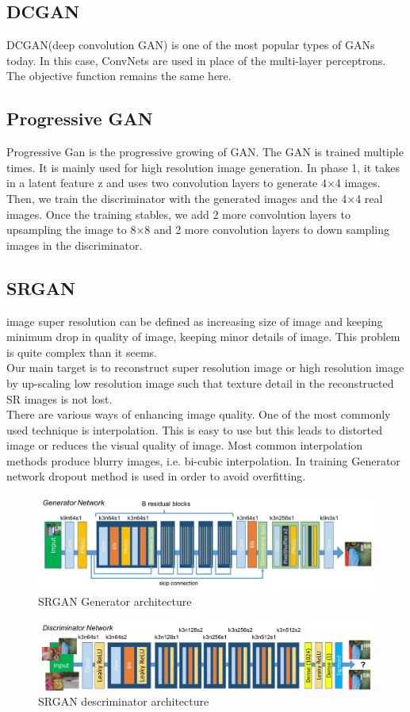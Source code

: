 \documentclass[12pt]{article}
\begin{document}
\subsection{DCGAN}
DCGAN(deep convolution GAN)\cite{ImageNet} is one of the most popular types of GANs\cite{GAN} today. In this case, ConvNets are used in place of the multi-layer perceptrons. The objective function remains the same here. 
\subsection{Progressive GAN}

Progressive Gan is the progressive growing of GAN. The GAN\cite{GAN} is trained multiple times. It is mainly used for high resolution image generation.
In phase 1, it takes in a latent feature z and uses two convolution layers to generate 4×4 images. Then, we train the discriminator with the generated images and the 4×4 real images. Once the training stables, we add 2 more convolution layers to upsampling the image to 8×8 and 2 more convolution layers to down sampling images in the discriminator.
\subsection{SRGAN}
image super resolution can be defined as increasing size of image and keeping minimum drop in quality of image, keeping minor details of image. This problem is quite complex than it seems.\\
Our main target is to reconstruct super resolution image or high resolution image by up-scaling low resolution image such that texture detail in the reconstructed SR images is not lost.\\
There are various ways of enhancing image quality. One of the most commonly used technique is interpolation. This is easy to use but this leads to distorted image or reduces the visual quality of image. Most common interpolation methods produce blurry images, i.e. bi-cubic interpolation.
In training Generator network dropout method is used in order to avoid overfitting. 

\begin{figure}[hbt!]
\includegraphics[scale=0.39]{srgang.png}
\caption{SRGAN Generator architecture}\end{figure}\begin{figure}
\includegraphics[scale=0.39]{srgand.png}
\caption{SRGAN descriminator architecture}
\end{figure}
\end{document}
